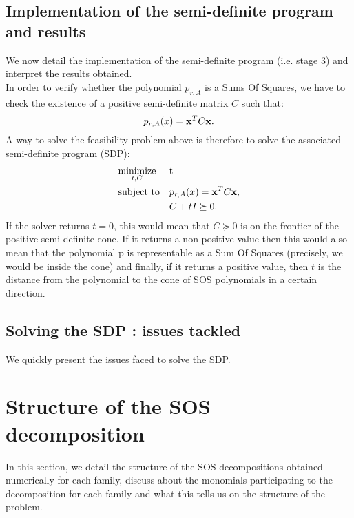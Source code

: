 \documentclass[onecolumn,11pt,a4paper]{article}
\theoremstyle{plain}  %
\theoremstyle{remark}  %
\begin{document}
\subsection{Implementation of the semi-definite program and results}
\label{sub:sdp}
We now detail the implementation of the semi-definite program (i.e. stage 3) and interpret the results obtained. \\
In order to verify whether the polynomial $p_{r, A}$ is a Sums Of Squares, we have to check the existence of a positive semi-definite matrix $C$ such that:
\begin{equation}
	p_{r, A}(x) = \vb{x}^T  C \vb{x}.
\end{equation}
A way to solve the feasibility problem above is therefore to solve the associated semi-definite program (SDP):
\begin{equation}
	\begin{aligned}
		& \underset{t, C}{\text{minimize}}
		& & \mathrm{t} \\
		& \text{subject to}
		& & p_{r, A}(x) = \vb{x}^T  C \vb{x}, \\
		&&& C + t I \succeq 0. 
	\end{aligned}
\end{equation}
If the solver returns $t = 0$, this would mean that $C \succeq 0$ is on the frontier of the positive semi-definite cone.
If it returns a non-positive value then this would also mean that the polynomial p is representable as a Sum Of Squares
 (precisely, we would be inside the cone) and finally, if it returns a positive value, then $t$ is the distance from
 the polynomial to the cone of SOS polynomials in a certain direction.
\subsection{Solving the SDP : issues tackled}
\label{sub:solving-issues}
We quickly present the issues faced to solve the SDP.
\section{Structure of the SOS decomposition}
\label{sec:sos-structure}
In this section, we detail the structure of the SOS decompositions obtained numerically for each family,
discuss about the monomials participating to the decomposition for each family and what this tells us on
the structure of the problem.
\end{document}

